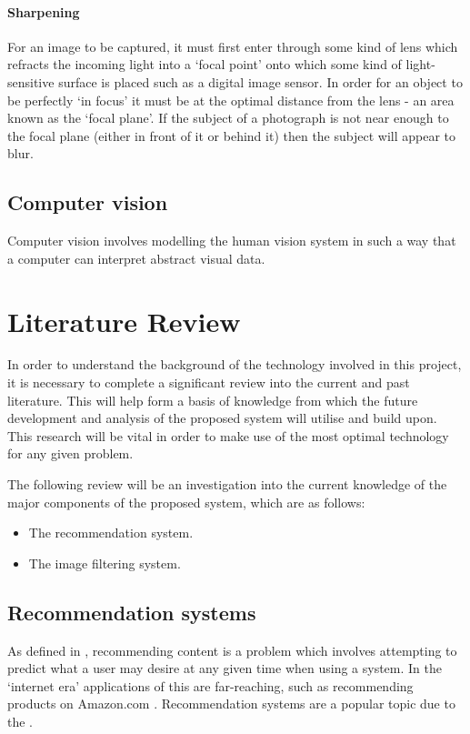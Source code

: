 \documentclass[a4paper,12pt]{report}
\begin{document}
     \subsubsection{Sharpening}
       For an image to be captured, it must first enter through some kind of lens which refracts the incoming light into a ‘focal point’ onto which some kind of light-sensitive surface is placed such as a digital image sensor. In order for an object to be perfectly ‘in focus’ it must be at the optimal distance from the lens - an area known as the ‘focal plane’. If the subject of a photograph is not near enough to the focal plane (either in front of it or behind it) then the subject will appear to blur.

  \section{Computer vision}
   Computer vision involves modelling the human vision system in such a way that a computer can interpret abstract visual data.

\chapter{Literature Review}

  In order to understand the background of the technology involved in this project, it is necessary to complete a significant review into the current and past literature. This will help form a basis of knowledge from which the future development and analysis of the proposed system will utilise and build upon. This research will be vital in order to make use of the most optimal technology for any given problem.

  The following review will be an investigation into the current knowledge of the major components of the proposed system, which are as follows:

  \begin{itemize}
    \item The recommendation system.
    \item The image filtering system.
  \end{itemize}

  \section{Recommendation systems} \label{sec:lit-recc}
    As defined in \cite{ricci2011introduction}, recommending content is a problem which involves attempting to predict what a user may desire at any given time when using a system. In the ‘internet era’ applications of this are far-reaching, such as recommending products on Amazon.com \cite{linden2003amazon}. Recommendation systems are a popular topic due to the  \citep{adomavicius2005toward}.
\end{document}
